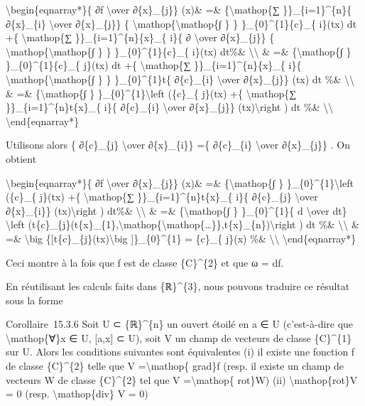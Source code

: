 \documentclass[]{article}
\begin{document}
\textbackslash{}begin\{eqnarray*\}\{ ∂f \textbackslash{}over
∂\{x\}\_\{j\}\} (x)\& =\& \{\textbackslash{}mathop\{∑
\}\}\_\{i=1\}\^{}\{n\}\{ ∂\{x\}\_\{i\} \textbackslash{}over
∂\{x\}\_\{j\}\} \{ \textbackslash{}mathop\{\textbackslash{}mathop\{∫ \}
\} \}\_\{0\}\^{}\{1\}\{c\}\_\{ i\}(tx) dt +\{ \textbackslash{}mathop\{∑
\}\}\_\{i=1\}\^{}\{n\}\{x\}\_\{ i\}\{ ∂ \textbackslash{}over
∂\{x\}\_\{j\}\} \{ \textbackslash{}mathop\{\textbackslash{}mathop\{∫ \}
\} \}\_\{0\}\^{}\{1\}\{c\}\_\{ i\}(tx) dt\%\&
\textbackslash{}\textbackslash{} \& =\& \{\textbackslash{}mathop\{∫ \}
\}\_\{0\}\^{}\{1\}\{c\}\_\{ j\}(tx) dt +\{ \textbackslash{}mathop\{∑
\}\}\_\{i=1\}\^{}\{n\}\{x\}\_\{ i\}\{
\textbackslash{}mathop\{\textbackslash{}mathop\{∫ \} \}
\}\_\{0\}\^{}\{1\}t\{ ∂\{c\}\_\{i\} \textbackslash{}over ∂\{x\}\_\{j\}\}
(tx) dt \%\& \textbackslash{}\textbackslash{} \& =\&
\{\textbackslash{}mathop\{∫ \} \}\_\{0\}\^{}\{1\}\textbackslash{}left
(\{c\}\_\{ j\}(tx) +\{ \textbackslash{}mathop\{∑
\}\}\_\{i=1\}\^{}\{n\}t\{x\}\_\{ i\}\{ ∂\{c\}\_\{i\}
\textbackslash{}over ∂\{x\}\_\{j\}\} (tx)\textbackslash{}right ) dt \%\&
\textbackslash{}\textbackslash{} \textbackslash{}end\{eqnarray*\}

Utilisons alors \{ ∂\{c\}\_\{j\} \textbackslash{}over ∂\{x\}\_\{i\}\}
=\{ ∂\{c\}\_\{i\} \textbackslash{}over ∂\{x\}\_\{j\}\} . On obtient

\textbackslash{}begin\{eqnarray*\}\{ ∂f \textbackslash{}over
∂\{x\}\_\{j\}\} (x)\& =\& \{\textbackslash{}mathop\{∫ \}
\}\_\{0\}\^{}\{1\}\textbackslash{}left (\{c\}\_\{ j\}(tx) +\{
\textbackslash{}mathop\{∑ \}\}\_\{i=1\}\^{}\{n\}t\{x\}\_\{ i\}\{
∂\{c\}\_\{j\} \textbackslash{}over ∂\{x\}\_\{i\}\}
(tx)\textbackslash{}right ) dt\%\& \textbackslash{}\textbackslash{} \&
=\& \{\textbackslash{}mathop\{∫ \} \}\_\{0\}\^{}\{1\}\{ d
\textbackslash{}over dt\} \textbackslash{}left
(t\{c\}\_\{j\}(t\{x\}\_\{1\},\textbackslash{}mathop\{\textbackslash{}mathop\{\ldots{}\}\},t\{x\}\_\{n\})\textbackslash{}right
) dt \%\& \textbackslash{}\textbackslash{} \& =\& \textbackslash{}big
\{{[}t\{c\}\_\{j\}(tx)\textbackslash{}big {]}\}\_\{0\}\^{}\{1\} =
\{c\}\_\{ j\}(x) \%\& \textbackslash{}\textbackslash{}
\textbackslash{}end\{eqnarray*\}

Ceci montre à la fois que f est de classe \{C\}\^{}\{2\} et que ω = df.

En réutilisant les calculs faits dans \{ℝ\}\^{}\{3\}, nous pouvons
traduire ce résultat sous la forme

Corollaire~15.3.6 Soit U ⊂ \{ℝ\}\^{}\{n\} un ouvert étoilé en a ∈ U
(c'est-à-dire que \textbackslash{}mathop\{∀\}x ∈ U, {[}a,x{]} ⊂ U), soit
V un champ de vecteurs de classe \{C\}\^{}\{1\} sur U. Alors les
conditions suivantes sont équivalentes (i) il existe une fonction f de
classe \{C\}\^{}\{2\} telle que V =\textbackslash{}mathop\{ grad\}f
(resp. il existe un champ de vecteurs W de classe \{C\}\^{}\{2\} tel que
V =\textbackslash{}mathop\{ rot\}W) (ii) \textbackslash{}mathop\{rot\}V
= 0 (resp. \textbackslash{}mathop\{div\} V = 0)
\end{document}
